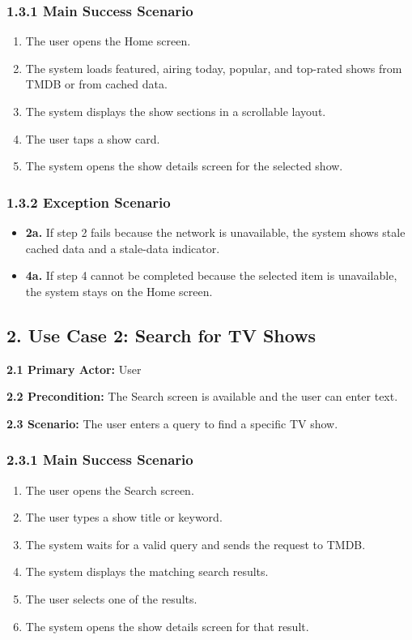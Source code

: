 \subsubsection*{1.3.1 Main Success Scenario}
\begin{enumerate}[label=\arabic*.]
	\item The user opens the Home screen.
	\item The system loads featured, airing today, popular, and top-rated shows from TMDB or from cached data.
	\item The system displays the show sections in a scrollable layout.
	\item The user taps a show card.
	\item The system opens the show details screen for the selected show.
\end{enumerate}

\subsubsection*{1.3.2 Exception Scenario}
\begin{itemize}
	\item \textbf{2a.} If step 2 fails because the network is unavailable, the system shows stale cached data and a stale-data indicator.
	\item \textbf{4a.} If step 4 cannot be completed because the selected item is unavailable, the system stays on the Home screen.
\end{itemize}

\subsection*{2. Use Case 2: Search for TV Shows}
\noindent\textbf{2.1 Primary Actor:} User

\noindent\textbf{2.2 Precondition:} The Search screen is available and the user can enter text.

\noindent\textbf{2.3 Scenario:} The user enters a query to find a specific TV show.

\subsubsection*{2.3.1 Main Success Scenario}
\begin{enumerate}[label=\arabic*.]
	\item The user opens the Search screen.
	\item The user types a show title or keyword.
	\item The system waits for a valid query and sends the request to TMDB.
	\item The system displays the matching search results.
	\item The user selects one of the results.
	\item The system opens the show details screen for that result.
\end{enumerate}

